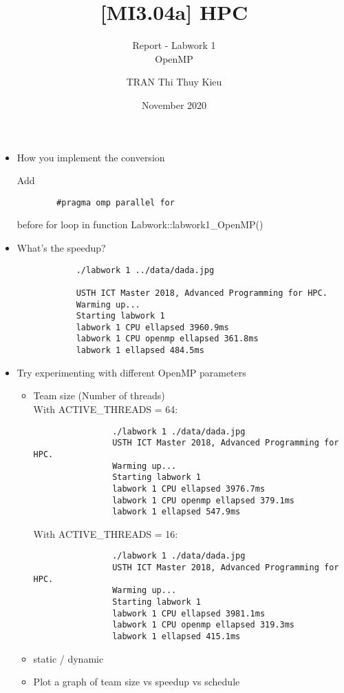 \documentclass[10pt, a4paper]{article}
\title{[MI3.04a] HPC}
\subtitle{Report - Labwork 1 \\ OpenMP}
\author{TRAN Thi Thuy Kieu}
\date{November 2020}
\begin{document}
\maketitle

\begin{itemize}
    \item How you implement the conversion
    
    Add 
    \begin{verbatim}
        #pragma omp parallel for
    \end{verbatim} 
    before for loop in function Labwork::labwork1\_OpenMP()
    
    
    \item What’s the speedup?
    
    \vspace{1mm}
        \begin{verbatim}
            ./labwork 1 ../data/dada.jpg
            
            USTH ICT Master 2018, Advanced Programming for HPC.
            Warming up...
            Starting labwork 1
            labwork 1 CPU ellapsed 3960.9ms
            labwork 1 CPU openmp ellapsed 361.8ms
            labwork 1 ellapsed 484.5ms
        \end{verbatim}
    

    \item Try experimenting with different OpenMP parameters
        \begin{itemize}
            \item Team size (Number of threads) \\
            \vspace{1mm}
            With ACTIVE\_THREADS = 64:
            \begin{verbatim}
                ./labwork 1 ./data/dada.jpg
                USTH ICT Master 2018, Advanced Programming for HPC.
                Warming up...
                Starting labwork 1
                labwork 1 CPU ellapsed 3976.7ms
                labwork 1 CPU openmp ellapsed 379.1ms
                labwork 1 ellapsed 547.9ms
            \end{verbatim}
            
            With ACTIVE\_THREADS = 16:
            \begin{verbatim}
                ./labwork 1 ./data/dada.jpg
                USTH ICT Master 2018, Advanced Programming for HPC.
                Warming up...
                Starting labwork 1
                labwork 1 CPU ellapsed 3981.1ms
                labwork 1 CPU openmp ellapsed 319.3ms
                labwork 1 ellapsed 415.1ms
            \end{verbatim}
            
            
            \item static / dynamic
            \item Plot a graph of team size vs speedup vs schedule
        \end{itemize}
    

    
\end{itemize}
\end{document}
